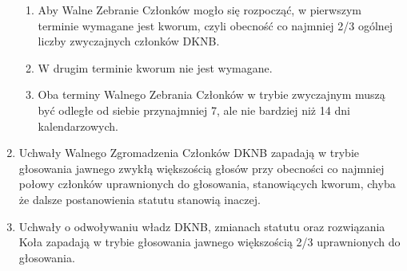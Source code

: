 \documentclass{article}
\begin{document}
\begin{enumerate}
\begin{enumerate}
        \item Aby Walne Zebranie Członków mogło się rozpocząć, w pierwszym terminie wymagane jest kworum, czyli obecność co najmniej 2/3 ogólnej liczby zwyczajnych członków DKNB.
        \item W drugim terminie kworum nie jest wymagane.
        \item Oba terminy Walnego Zebrania Członków w trybie zwyczajnym muszą być odległe od siebie przynajmniej 7, ale nie bardziej niż 14 dni kalendarzowych.
      \end{enumerate}
    \item Uchwały Walnego Zgromadzenia Członków DKNB zapadają w trybie głosowania jawnego zwykłą większością głosów przy obecności co najmniej połowy członków uprawnionych do głosowania, stanowiących kworum, chyba że dalsze postanowienia statutu stanowią inaczej.
    \item Uchwały o odwoływaniu władz DKNB, zmianach statutu oraz rozwiązania Koła zapadają w trybie głosowania jawnego większością 2/3 uprawnionych do głosowania.
\end{enumerate}
\end{document}

